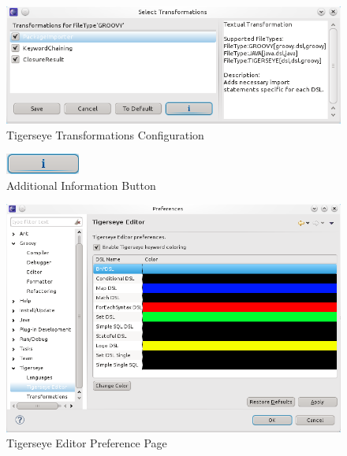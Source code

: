 \documentclass[article,colorback,accentcolor=tud4c]{tudreport}
\begin{document}
	\begin{figure}
	  \centering
	  \includegraphics[scale=.5,keepaspectratio=true]{./pics/preferences_transformations_selected.png}
	  \caption{Tigerseye Transformations Configuration}
	  \label{fig:prefs_transformations_selected}
	\end{figure}

	\begin{figure}
	  \centering
	  \includegraphics{./pics/additional_information_button.png}
	  \caption{Additional Information Button}
	  \label{fig:additional_information_button}
	\end{figure}

	\begin{figure}
	  \centering
	  \includegraphics[scale=.5,keepaspectratio=true]{./pics/preferences_editor.png}
	  \caption{Tigerseye Editor Preference Page}
	  \label{fig:prefs_editor}
	\end{figure}
\end{document}
